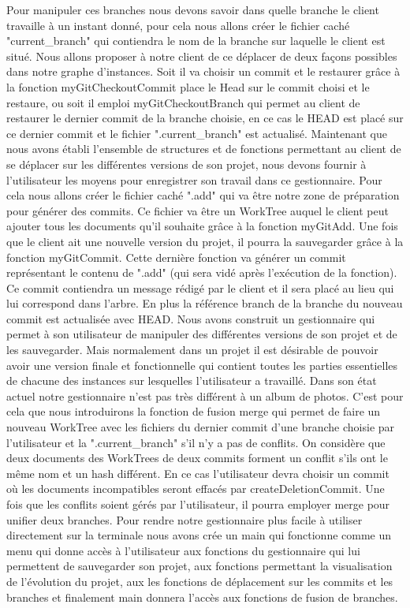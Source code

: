 \documentclass[12pt,francais]{article}
\begin{document}
	Pour manipuler ces branches nous devons savoir dans quelle branche le client travaille à un instant donné, pour cela nous allons créer le fichier caché  "current\_branch" qui contiendra le nom de la branche sur laquelle le client est situé. Nous allons proposer à notre client de ce déplacer de deux façons possibles dans notre graphe d’instances. Soit il va choisir un commit et le restaurer grâce à la fonction myGitCheckoutCommit place le Head sur le commit choisi et le restaure, ou soit il emploi myGitCheckoutBranch qui permet au client de restaurer le dernier commit de la branche choisie, en ce cas le HEAD est placé sur ce dernier commit et le fichier ".current\_branch" est actualisé. \newline \newline
	Maintenant que nous avons établi l’ensemble de structures et de fonctions permettant au client de se déplacer sur les différentes versions de son projet, nous devons fournir à l’utilisateur les moyens pour enregistrer son travail dans ce gestionnaire. Pour cela nous allons créer le fichier caché ".add" qui va être notre zone de préparation pour générer des commits. Ce fichier va être un WorkTree auquel le client peut ajouter tous les documents qu’il souhaite grâce à la fonction myGitAdd. Une fois que le client ait une nouvelle version du projet, il pourra la sauvegarder grâce à la fonction myGitCommit. Cette dernière fonction va générer un commit représentant le contenu de ".add" (qui sera vidé après l’exécution de la fonction). Ce commit contiendra un message rédigé par le client et il sera placé au lieu qui lui correspond dans l’arbre. En plus la référence branch de la branche du nouveau commit est actualisée avec  HEAD. \newline \newline
	Nous avons construit un gestionnaire qui permet à son utilisateur de manipuler des différentes versions de son projet et de les sauvegarder. Mais normalement dans un projet il est désirable de pouvoir avoir une version finale et fonctionnelle qui contient toutes les parties essentielles de chacune des instances sur lesquelles l’utilisateur a travaillé. Dans son état actuel notre gestionnaire n’est pas très différent à un album de photos. C’est pour cela que nous introduirons la fonction de fusion merge qui permet de faire un nouveau WorkTree avec les fichiers du dernier commit d’une branche choisie par l’utilisateur et la ".current\_branch" s’il n’y a pas de conflits. On considère que deux documents des WorkTrees de deux commits forment un conflit s’ils ont le même nom et un hash différent. En ce cas l’utilisateur devra choisir un commit  où les documents incompatibles seront effacés par createDeletionCommit. Une fois que les conflits soient gérés par l’utilisateur, il pourra employer merge pour unifier deux branches.
	Pour rendre notre gestionnaire plus facile à utiliser directement sur la terminale nous avons crée un main qui fonctionne comme un menu qui donne accès à l’utilisateur aux fonctions du gestionnaire qui lui permettent de sauvegarder son projet, aux fonctions permettant la  visualisation de l’évolution du projet, aux les fonctions de déplacement sur les commits et les branches et finalement main donnera l’accès aux fonctions de fusion de branches. 	
\end{document}
